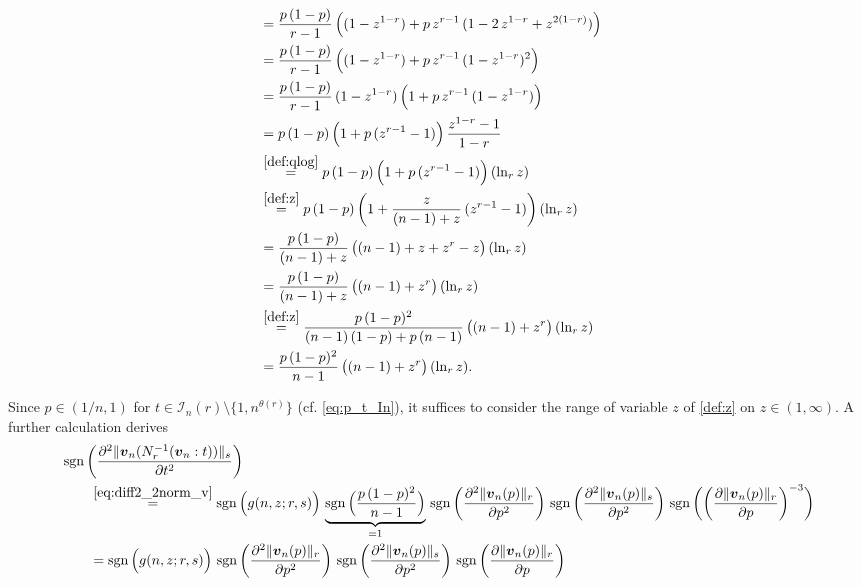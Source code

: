 \documentclass[conference, draftcls, onecolumn]{IEEEtran}
\theoremstyle{plain}
\newcommand{\bvec}[1]{\boldsymbol{#1}}
\newcommand{\sgn}{\operatorname{sgn}}
\newcommand{\lemref}[1]{Lemma~\ref{#1}}
\begin{document}
\begin{IEEEproof}[Proof of \lemref{lem:convex_v}]
\begin{itemize}
\begin{align}
\\
& =
\frac{ p \, (1-p) }{ r - 1 } \, \Big( (1 - z^{1-r}) + p \, z^{r-1} \, (1 - 2 \, z^{1-r} + z^{2(1-r)}) \Big)
\\
& =
\frac{ p \, (1-p) }{ r - 1 } \, \Big( (1 - z^{1-r}) + p \, z^{r-1} \, (1 - z^{1-r})^{2} \Big)
\\
& =
\frac{ p \, (1-p) }{ r - 1 } \, (1 - z^{1-r}) \, \Big( 1 + p \, z^{r-1} \, (1-z^{1-r}) \Big)
\\
& =
p \, (1-p) \, \Big( 1 + p \, (z^{r-1}-1) \Big) \, \frac{ z^{1-r} - 1 }{ 1 - r }
\\
& \overset{\eqref{def:qlog}}{=}
p \, (1-p) \, \Big( 1 + p \, (z^{r-1}-1) \Big) \, (\ln_{r} z)
\\
& \overset{\eqref{def:z}}{=}
p \, (1-p) \, \bigg( 1 + \frac{ z }{ (n-1) + z } \, (z^{r-1}-1) \bigg) \, (\ln_{r} z)
\\
& =
\frac{ p \, (1-p) }{ (n-1) + z } \, \big( (n-1) + z + z^{r} - z \big) \, (\ln_{r} z)\\
& =
\frac{ p \, (1-p) }{ (n-1) + z } \, \big( (n-1) + z^{r} \big) \, (\ln_{r} z)
\\
& \overset{\eqref{def:z}}{=}
\frac{ p \, (1-p)^{2} }{ (n-1) \, (1-p) + p \, (n-1) } \, \big( (n-1) + z^{r} \big) \, (\ln_{r} z)
\\
& =
\frac{ p \, (1-p)^{2} }{ n-1 } \, \big( (n-1) + z^{r} \big) \, (\ln_{r} z) .
\end{align}
\end{itemize}
Since $p \in (1/n, 1)$ for $t \in \mathcal{I}_{n}( r ) \setminus \{ 1, n^{\theta( r )} \}$ (cf. \eqref{eq:p_t_In}), it suffices to consider the range of variable $z$ of \eqref{def:z} on $z \in (1, \infty)$.
A further calculation derives
\begin{align}
&
\sgn \bigg( \frac{ \partial^{2} \| \bvec{v}_{n}( N_{r}^{-1}( \bvec{v}_{n} : t ) ) \|_{s} }{ \partial t^{2} } \bigg)
\notag \\
& \qquad \overset{\eqref{eq:diff2_2norm_v}}{=}
\sgn\Big( g(n, z; r, s) \Big) \, \underbrace{ \sgn\Big( \frac{ p \, (1-p)^{2} }{ n-1 } \Big) }_{ = 1 } \, \sgn\bigg( \frac{ \partial^{2} \| \bvec{v}_{n}( p ) \|_{r} }{ \partial p^{2} } \bigg) \, \sgn\bigg( \frac{ \partial^{2} \| \bvec{v}_{n}( p ) \|_{s} }{ \partial p^{2} } \bigg) \, \sgn \bigg( \bigg( \frac{ \partial \| \bvec{v}_{n}( p ) \|_{r} }{ \partial p } \bigg)^{-3} \bigg)
\\
& \qquad =
\sgn\Big( g(n, z; r, s) \Big) \, \sgn\bigg( \frac{ \partial^{2} \| \bvec{v}_{n}( p ) \|_{r} }{ \partial p^{2} } \bigg) \, \sgn\bigg( \frac{ \partial^{2} \| \bvec{v}_{n}( p ) \|_{s} }{ \partial p^{2} } \bigg) \, \sgn \bigg( \frac{ \partial \| \bvec{v}_{n}( p ) \|_{r} }{ \partial p } \bigg)

\end{align}
\end{IEEEproof}
\end{document}
